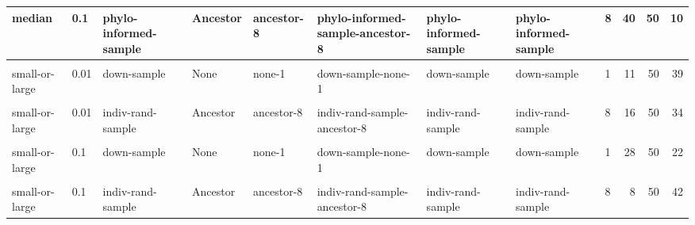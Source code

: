 \documentclass[
]{book}
\begin{document}
\begin{table}
\begin{tabular}{l|l|l|l|l|l|l|l|l|r|r|r}
\hline
median & 0.1 & phylo-informed-sample & Ancestor & ancestor-8 & phylo-informed-sample-ancestor-8 & phylo-informed-sample & phylo-informed-sample & 8 & 40 & 50 & 10\\
\hline
\cellcolor{gray!6}{median} & \cellcolor{gray!6}{1} & \cellcolor{gray!6}{full} & \cellcolor{gray!6}{None} & \cellcolor{gray!6}{none-1} & \cellcolor{gray!6}{full-none-1} & \cellcolor{gray!6}{full} & \cellcolor{gray!6}{full} & \cellcolor{gray!6}{1} & \cellcolor{gray!6}{34} & \cellcolor{gray!6}{100} & \cellcolor{gray!6}{66}\\
\hline
small-or-large & 0.01 & down-sample & None & none-1 & down-sample-none-1 & down-sample & down-sample & 1 & 11 & 50 & 39\\
\hline
\cellcolor{gray!6}{small-or-large} & \cellcolor{gray!6}{0.01} & \cellcolor{gray!6}{down-sample} & \cellcolor{gray!6}{Ancestor} & \cellcolor{gray!6}{ancestor-8} & \cellcolor{gray!6}{down-sample-ancestor-8} & \cellcolor{gray!6}{down-sample} & \cellcolor{gray!6}{down-sample-ancestor} & \cellcolor{gray!6}{8} & \cellcolor{gray!6}{8} & \cellcolor{gray!6}{50} & \cellcolor{gray!6}{42}\\
\hline
small-or-large & 0.01 & indiv-rand-sample & Ancestor & ancestor-8 & indiv-rand-sample-ancestor-8 & indiv-rand-sample & indiv-rand-sample & 8 & 16 & 50 & 34\\
\hline
\cellcolor{gray!6}{small-or-large} & \cellcolor{gray!6}{0.01} & \cellcolor{gray!6}{phylo-informed-sample} & \cellcolor{gray!6}{Ancestor} & \cellcolor{gray!6}{ancestor-8} & \cellcolor{gray!6}{phylo-informed-sample-ancestor-8} & \cellcolor{gray!6}{phylo-informed-sample} & \cellcolor{gray!6}{phylo-informed-sample} & \cellcolor{gray!6}{8} & \cellcolor{gray!6}{14} & \cellcolor{gray!6}{50} & \cellcolor{gray!6}{36}\\
\hline
small-or-large & 0.1 & down-sample & None & none-1 & down-sample-none-1 & down-sample & down-sample & 1 & 28 & 50 & 22\\
\hline
\cellcolor{gray!6}{small-or-large} & \cellcolor{gray!6}{0.1} & \cellcolor{gray!6}{down-sample} & \cellcolor{gray!6}{Ancestor} & \cellcolor{gray!6}{ancestor-8} & \cellcolor{gray!6}{down-sample-ancestor-8} & \cellcolor{gray!6}{down-sample} & \cellcolor{gray!6}{down-sample-ancestor} & \cellcolor{gray!6}{8} & \cellcolor{gray!6}{21} & \cellcolor{gray!6}{50} & \cellcolor{gray!6}{29}\\
\hline
small-or-large & 0.1 & indiv-rand-sample & Ancestor & ancestor-8 & indiv-rand-sample-ancestor-8 & indiv-rand-sample & indiv-rand-sample & 8 & 8 & 50 & 42\\

\end{tabular}
\end{table}
\end{document}
